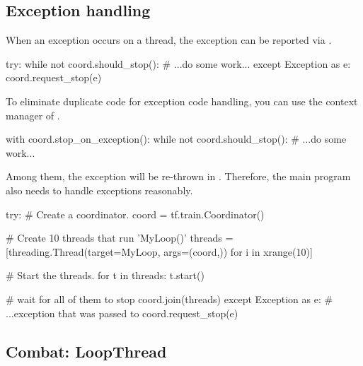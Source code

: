 \begin{content}
\subsection{Exception handling}
When an exception occurs on a thread, the exception can be reported via .

\begin{leftbar}
\begin{python}
try:
  while not coord.should_stop():
    # ...do some work...
except Exception as e:
  coord.request_stop(e)
\end{python}
\end{leftbar}

To eliminate duplicate code for exception code handling, you can use the context manager of .

\begin{leftbar}
\begin{python}
with coord.stop_on_exception():
  while not coord.should_stop():
    # ...do some work...
\end{python}
\end{leftbar}

Among them, the exception will be re-thrown in . Therefore, the main program also needs to handle exceptions reasonably.

\begin{leftbar}
\begin{python}
try:
  # Create a coordinator.
  coord = tf.train.Coordinator()

  # Create 10 threads that run 'MyLoop()'
  threads = [threading.Thread(target=MyLoop, args=(coord,)) 
            for i in xrange(10)]

  # Start the threads.
  for t in threads:
    t.start()

  # wait for all of them to stop
  coord.join(threads)
except Exception as e:
  # ...exception that was passed to coord.request\_stop(e)
\end{python}
\end{leftbar}


\subsection{Combat: LoopThread}
\end{content}



